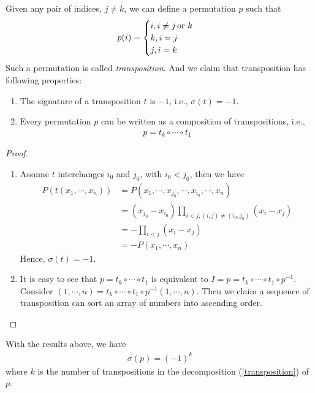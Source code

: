 \documentclass[11pt]{book}
\theoremstyle{definition}
\numberwithin{equation}{subsection}
\begin{document}
Given any pair of indices, $j\neq k$, we can define a permutation $p$ such that
\begin{align*}
    p(i) = \begin{cases}
    i, i\neq j\, {\rm or}\,\, k \\
    k, i = j \\
    j, i = k
    \end{cases}
\end{align*}
Such a permutation is called \emph{transposition}. And we claim that transposition has following properties:
\begin{enumerate}[label=(\arabic*)]
    \item The signature of a transposition $t$ is $-1$, i.e., $\sigma(t) = -1$.
    \item Every permutation $p$ can be written as a composition of transpositions, i.e., 
    \begin{align}\label{transposition}
        p = t_k\circ \cdots \circ t_1
    \end{align}
\end{enumerate}
\begin{proof}
~\begin{enumerate}[label=(\arabic*)]
    \item Assume $t$ interchanges $i_0$ and $j_0$, with $i_0<j_0$, then we have
    \begin{align*}
        P\left(t(x_1,\cdots,x_n)\right) & = P(x_1,\cdots,x_{j_0},\cdots,x_{i_0},\cdots,x_n) \\
        & = (x_{j_0} - x_{i_0})\prod_{i<j,(i,j)\neq(i_0,j_0)} (x_i - x_j) \\
        & = - \prod_{i<j}(x_i - x_j) \\
        & = - P(x_1,\cdots,x_n)
    \end{align*}
    Hence, $\sigma(t) = -1$.
    \item It is easy to see that $p = t_k\circ \cdots \circ t_1$ is equivalent to $I = p = t_k\circ \cdots \circ t_1 \circ p^{-1}$. Consider $(1,\cdots, n) = t_k\circ \cdots \circ t_1 \circ p^{-1}(1,\cdots,n)$. Then we claim a sequence of transposition can sort an array of numbers into ascending order.
\end{enumerate}
\end{proof}

With the results above, we have
\begin{align*}
    \sigma(p) = (-1)^{k}
\end{align*}
where $k$ is the number of transpositions in the decomposition (\ref{transposition}) of $p$.
\end{document}
